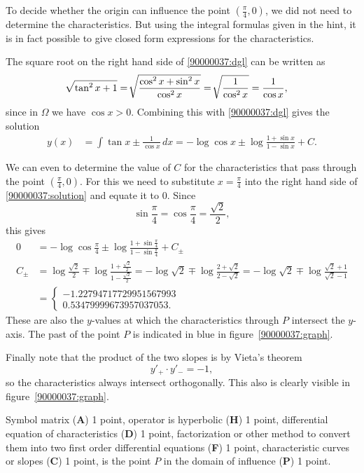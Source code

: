 \begin{diskussion}
To decide whether the origin can influence the point $(\frac{\pi}4,0)$,
we did not need to determine the characteristics.
But using the integral formulas given in the hint, it is in fact possible
to give closed form expressions for the characteristics.

The square root on the right hand side of
\eqref{90000037:dgl}
can be written as
\begin{align*}
\!\sqrt{\tan^2 x+1}
&=
\!\sqrt{
\frac{\mathstrut\smash{\cos\!\mathstrut^2\,x+\sin\!\mathstrut^2\,x}}{\cos^2x}
}
=
\!\sqrt{\frac{1}{\cos^2x}}
=
\frac{1}{\cos x},
\end{align*}
since in $\Omega$ we have $\cos x > 0$.
Combining this with \eqref{90000037:dgl} gives the solution
\begin{align}
y(x)
&=
\int \tan x\pm\frac{1}{\cos x}\,dx
=
-\log\cos x \pm \log\frac{1 + \sin x}{1 - \sin x} + C.
\label{90000037:solution}
\end{align}

We can even to determine the value of $C$ for the characteristics
that pass through the point $(\frac{\pi}{4},0)$.
For this we need to substitute $x=\frac{\pi}{4}$ into the
right hand side of \eqref{90000037:solution}
and equate it to $0$.
Since
\[
\sin\frac{\pi}4=\cos\frac{\pi}4=\frac{\!\sqrt{2}}{2},
\]
this gives
\begin{align*}
0
&=
-\log\cos \frac{\pi}4
\pm
\log\frac{1+\sin\frac{\pi}4}{1-\sin\frac{\pi}4}
+
C_\pm
\\
C_\pm
&=
\log\frac{\!\sqrt{2}}{2}
\mp
\log\frac{1+\frac{\!\sqrt{2}}{2}}{1-\frac{\!\sqrt{2}}2}
=
-\log\!\sqrt{2}
\mp
\log\frac{2+\!\sqrt{2}}{2-\!\sqrt{2}}
=
-\log\!\sqrt{2}
\mp
\log\frac{\!\sqrt{2}+1}{\!\sqrt{2}-1}
\\
&=
\left\{
\begin{aligned}
-1.22794717729951567993\phantom{.}
\\
0.53479999673957037053.
\end{aligned}
\right.
\end{align*}
These are also the $y$-values at which the characteristics through
$P$ intersect the $y$-axis.
The past of the point $P$ is indicated in blue in 
figure~\ref{90000037:graph}.

Finally note that the product of the two slopes is by Vieta's theorem
\[
y'_+\cdot y'_- = -1,
\]
so the characteristics always intersect orthogonally.
This also is clearly visible in figure~\ref{90000037:graph}.
\end{diskussion}

\begin{bewertung}
Symbol matrix ({\bf A}) 1 point,
operator is hyperbolic ({\bf H}) 1 point,
differential equation of characteristics ({\bf D}) 1 point,
factorization or other method to convert them into two first order
differential equations ({\bf F}) 1 point,
characteristic curves or slopes ({\bf C}) 1 point,
is the point $P$ in the domain of influence ({\bf P}) 1 point.
\end{bewertung}

